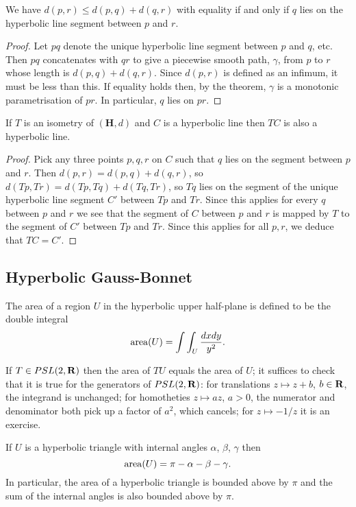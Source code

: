 \documentclass[12pt]{article}
\begin{document}
\begin{cor}
  We have $d(p,r)\leq d(p,q)+d(q,r)$ with equality if and only if $q$ lies on the hyperbolic line segment between $p$ and $r$.
\end{cor}
\begin{proof}
  Let $pq$ denote the unique hyperbolic line segment between $p$ and $q$, etc. Then $pq$ concatenates with $qr$ to give a piecewise smooth path, $\gamma$, from $p$ to $r$ whose length is $d(p,q)+d(q,r)$. Since $d(p,r)$ is defined as an infimum, it must be less than this. If equality holds then, by the theorem, $\gamma$ is a monotonic parametrisation of $pr$. In particular, $q$ lies on $pr$.
\end{proof}

\begin{cor}
  If $T$ is an isometry of $(\mathbf{H},d)$ and $C$ is a hyperbolic line then $TC$ is also a hyperbolic line.
\end{cor}
\begin{proof}
  Pick any three points $p,q,r$ on $C$ such that $q$ lies on the segment between $p$ and $r$. Then $d(p,r)=d(p,q)+d(q,r)$, so $d(Tp,Tr)=d(Tp,Tq)+d(Tq,Tr)$, so $Tq$ lies on the segment of the unique hyperbolic line segment $C'$ between $Tp$ and $Tr$. Since this applies for every $q$ between $p$ and $r$ we see that the segment of $C$ between $p$ and $r$ is mapped by $T$ to the segment of $C'$ between $Tp$ and $Tr$. Since this applies for all $p,r$, we deduce that $TC=C'$.
\end{proof}

\subsection{Hyperbolic Gauss-Bonnet}

\begin{dfn}
  The area of a region $U$ in the hyperbolic upper half-plane is defined to be the double integral
  \[\operatorname{area}(U)=\int\int_U\frac{dx dy}{y^2}.\]
\end{dfn}

If $T\in PSL(2,\mathbf{R})$ then the area of $TU$ equals the area of $U$; it suffices to check that it is true for the generators of $PSL(2,\mathbf{R})$: for translations $z\mapsto z+b$, $b\in\mathbf{R}$, the integrand is unchanged; for homotheties $z\mapsto az$, $a>0$, the numerator and denominator both pick up a factor of $a^2$, which cancels; for $z\mapsto -1/z$ it is an exercise.

\begin{thm}
  If $U$ is a hyperbolic triangle with internal angles $\alpha$, $\beta$, $\gamma$ then
  \[\operatorname{area}(U)=\pi-\alpha-\beta-\gamma.\]
  In particular, the area of a hyperbolic triangle is bounded above by $\pi$ and the sum of the internal angles is also bounded above by $\pi$.
\end{thm}
\end{document}
